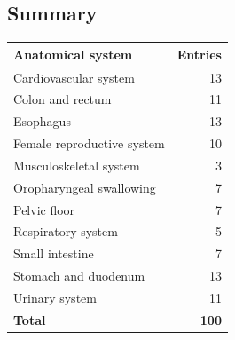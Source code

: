 \subsection{Summary}
\begin{center}
\begin{tabular}{@{}lr@{}}
\toprule
\textbf{Anatomical system} & \textbf{Entries} \\
\midrule
Cardiovascular system & 13 \\
Colon and rectum & 11 \\
Esophagus & 13 \\
Female reproductive system & 10 \\
Musculoskeletal system & 3 \\
Oropharyngeal swallowing & 7 \\
Pelvic floor & 7 \\
Respiratory system & 5 \\
Small intestine & 7 \\
Stomach and duodenum & 13 \\
\midrule
Urinary system & 11 \\
\midrule
\textbf{Total} & \textbf{100} \\
\bottomrule
\end{tabular}
\end{center}

